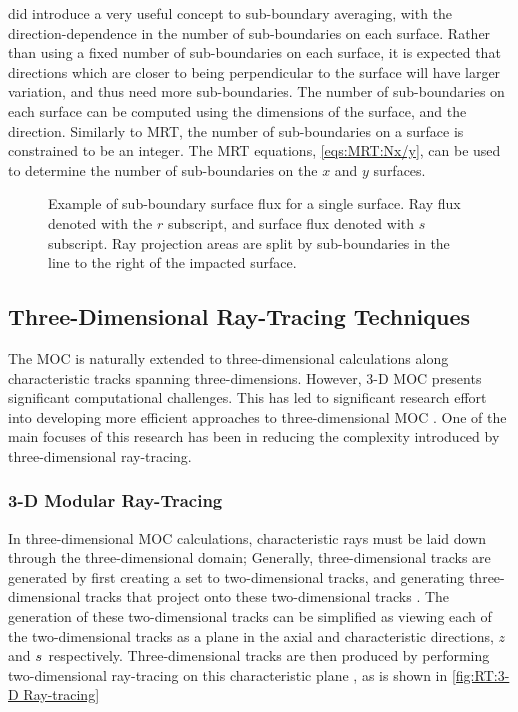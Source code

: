 {{{{          \citet{Liu2014} did introduce a very useful concept to sub-boundary averaging, with the direction-dependence in the number of sub-boundaries on each surface.
          Rather than using a fixed number of sub-boundaries on each surface, it is expected that directions which are closer to being perpendicular to the surface will have larger variation, and thus need more sub-boundaries.
          The number of sub-boundaries on each surface can be computed using the dimensions of the surface, and the direction.
          Similarly to \ac{MRT}, the number of sub-boundaries on a surface is constrained to be an integer.
          The \ac{MRT} equations, \cref{eqs:MRT:Nx/y}, can be used to determine the number of sub-boundaries on the $x$ and $y$ surfaces.

          \begin{figure}
            \centering
            \def\svgwidth{0.75\linewidth}
            
            \caption{
              Example of sub-boundary surface flux for a single surface.
              Ray flux denoted with the $r$ subscript, and surface flux denoted with $s$ subscript.
              Ray projection areas are split by sub-boundaries in the line to the right of the impacted surface.
              \label{fig:RT:2D SubBoundarySurfaceFlux}}
          \end{figure}
        }
      }

      \subsection{Three-Dimensional Ray-Tracing Techniques}{\label{ssec:RT:Three-Dimensional Ray-Tracing Techniques}
        The \ac{MOC} is naturally extended to three-dimensional calculations along characteristic tracks spanning three-dimensions.
        However, 3-D \ac{MOC} presents significant computational challenges.
        This has led to significant research effort into developing more efficient approaches to three-dimensional \ac{MOC} \cite{Kochunas2013,Tramm2016,Yamamoto2017,Graziano2017,Gunow2017}.
        One of the main focuses of this research has been in reducing the complexity introduced by three-dimensional ray-tracing.

        \subsubsection{3-D Modular Ray-Tracing}{\label{sssec:RT:3D Modular Ray-Tracing}
          In three-dimensional \ac{MOC} calculations, characteristic rays must be laid down through the three-dimensional domain;
          Generally, three-dimensional tracks are generated by first creating a set to two-dimensional tracks, and generating three-dimensional tracks that project onto these two-dimensional tracks \cite{Kochunas2013,Shaner2015}.
          The generation of these two-dimensional tracks can be simplified as viewing each of the two-dimensional tracks as a plane in the axial and characteristic directions, $z$ and $\len$ respectively.
          Three-dimensional tracks are then produced by performing two-dimensional ray-tracing on this characteristic plane \cite{Kochunas2013}, as is shown in \cref{fig:RT:3-D Ray-tracing}

}}}}

